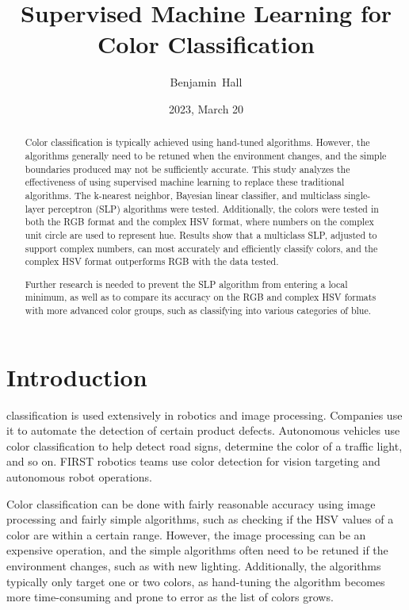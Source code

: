 \documentclass[twoside]{IEEEtran}
\title{Supervised Machine Learning for \\ Color Classification}
\author{Benjamin~Hall}
\date{2023, March 20}
\begin{document}
\maketitle

\begin{abstract}
    Color classification is typically achieved using hand-tuned algorithms. However, the algorithms generally need to be
    retuned when the environment changes, and the simple boundaries produced may not be sufficiently accurate. This study
    analyzes the effectiveness of using supervised machine learning to replace these traditional algorithms. The k-nearest
    neighbor, Bayesian linear classifier, and multiclass single-layer perceptron (SLP) algorithms were tested. Additionally,
    the colors were tested in both the RGB format and the complex HSV format, where numbers on the complex unit circle are
    used to represent hue. Results show that a multiclass SLP, adjusted to support complex numbers, can most accurately and
    efficiently classify colors, and the complex HSV format outperforms RGB with the data tested.

    Further research is needed to prevent the SLP algorithm from entering a local minimum, as well as to compare its
    accuracy on the RGB and complex HSV formats with more advanced color groups, such as classifying into various
    categories of blue.
\end{abstract}

\section{Introduction}

 classification is used extensively in robotics and image processing. Companies use it to
automate the detection of certain product defects. Autonomous vehicles use color classification
to help detect road signs, determine the color of a traffic light, and so on. FIRST robotics teams
use color detection for vision targeting and autonomous robot operations.

Color classification can be done with fairly reasonable accuracy using image processing and
fairly simple algorithms, such as checking if the HSV values of a color are within a certain
range. However, the image processing can be an expensive operation, and the simple algorithms
often need to be retuned if the environment changes, such as with new lighting. Additionally, the
algorithms typically only target one or two colors, as hand-tuning the algorithm becomes more
time-consuming and prone to error as the list of colors grows.
\end{document}
